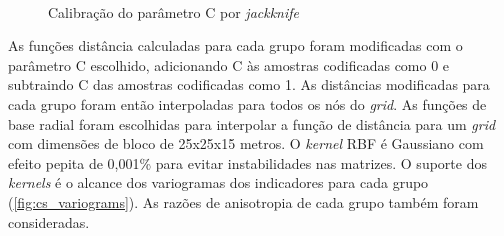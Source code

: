 \begin{figure}[H]
    \caption{Calibração do parâmetro C por \textit{jackknife}} \label{fig:uncert_groups}
     \centering
     \\
\end{figure}

As funções distância calculadas para cada grupo foram modificadas com o parâmetro C escolhido, adicionando C às amostras codificadas como 0 e subtraindo C das amostras codificadas como 1. As distâncias modificadas para cada grupo foram então interpoladas para todos os nós do \textit{grid}. As funções de base radial foram escolhidas para interpolar a função de distância para um \textit{grid} com dimensões de bloco de 25x25x15 metros. O \textit{kernel} RBF é Gaussiano com efeito pepita de 0,001\% para evitar instabilidades nas matrizes. O suporte dos \textit{kernels} é o alcance dos variogramas dos indicadores para cada grupo (\autoref{fig:cs_variograms}). As razões de anisotropia de cada grupo também foram consideradas.

